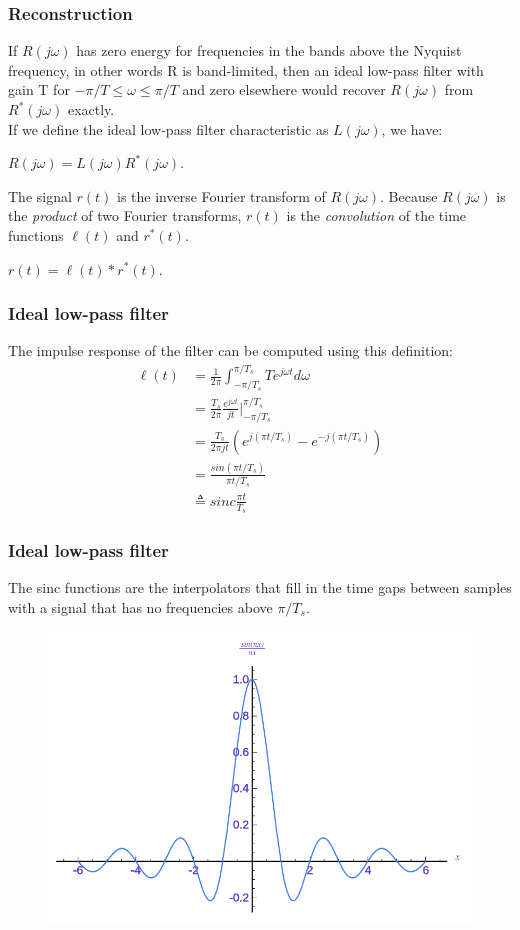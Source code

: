 \begin{frame}
	\frametitle{Reconstruction}
	If $R(j\omega)$ has zero energy for frequencies in the bands above the Nyquist frequency, in other words R is band-limited, then an ideal low-pass filter with gain T for $-\pi/T \leq \omega \leq \pi/T$ and zero elsewhere would recover $R(j\omega)$ from $R^*(j\omega)$ exactly.\\
	\medskip
	If we define the ideal low-pass filter characteristic as $L(j\omega)$, we have:
	\begin{center}
		$R(j\omega)=L(j\omega)R^*(j\omega)$.
	\end{center}
	The signal $r(t)$ is the inverse Fourier transform of $R(j\omega)$. Because $R(j\omega)$ is the \textit{product} of two Fourier transforms, $r(t)$ is the \textit{convolution} of the time functions $\ell(t)$ and $r^*(t)$.\\
	\begin{center}
		$r(t) = \ell(t) * r^*(t)$.
	\end{center}
\end{frame}

\begin{frame}
	\frametitle{Ideal low-pass filter}
	The impulse response of the filter can be computed using this definition:\\
	\vspace{-1em}
	\begin{equation}
	\begin{split}
	\ell(t) & = \frac{1}{2\pi} \int_{-\pi/T_s}^{\pi/T_s}Te^{j\omega t}d\omega\\
	& = \frac{T_s}{2\pi} \frac{e^{j\omega t}}{jt} \Big|_{-\pi/T_s}^{\pi/T_s}\\
	& = \frac{T_s}{2\pi jt}(e^{j(\pi t/T_s)}-e^{-j(\pi t/T_s)})\\
	& = \frac{sin(\pi t/T_s)}{\pi t/T_s}\\
	& \triangleq sinc\frac{\pi t}{T_s} \nonumber
	\end{split}
	\end{equation}
\end{frame}

\begin{frame}
	\frametitle{Ideal low-pass filter}
	The sinc functions are the interpolators that fill in the time gaps between samples with a signal that has no frequencies above $\pi/T_s$.
	\begin{figure}
		\centering
		\includegraphics[width=0.7\linewidth]{sinc}
	\end{figure}
\end{frame}

